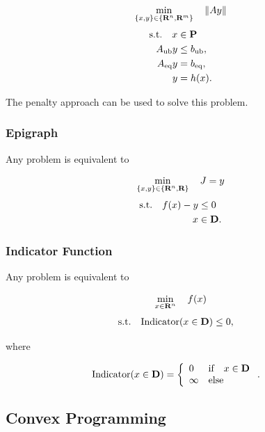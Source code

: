 \documentclass{article}
\begin{document}
    \begin{align*}
        \min_{\{x,y\}\in\{\textbf{R}^n,\textbf{R}^m\}}\quad \|Ay\|
    \end{align*} 
    \begin{align*}
        \text{s.t.}\quad x&\in\textbf{P}\\
        A_{\text{ub}} y&\leq b_{\text{ub}},\\
        A_{\text{eq}} y&=b_{\text{eq}},\\ 
        y&=h(x).
    \end{align*}

    The penalty approach can be used to solve this problem.\\

\clearpage

\subsubsection{Epigraph}

    Any problem is equivalent to

    \begin{align*}
        \min_{\{x,y\}\in\{\textbf{R}^n,\textbf{R}\}} \quad J =y
    \end{align*}
    \begin{align*}
        \text{s.t.}\quad f(x)-y&\leq0\\
        x&\in\textbf{D}.
    \end{align*}

\subsubsection{Indicator Function}

    Any problem is equivalent to

    \begin{align*}
        \min_{x\in\textbf{R}^n}\quad f(x)
    \end{align*}
    \begin{align*}
        \text{s.t.}\quad \text{Indicator}(x\in\textbf{D})&\leq0,
    \end{align*}
    
    where

    \begin{align*}
        \text{Indicator}(x\in\textbf{D})
        &=\left\{ \begin{array}{lllllllllllllllllll}
            0 & \text{if}\quad x\in\textbf{D}\\
            \infty & \text{else}
        \end{array}\right..
    \end{align*}

\subsection{Convex Programming}
\end{document}
